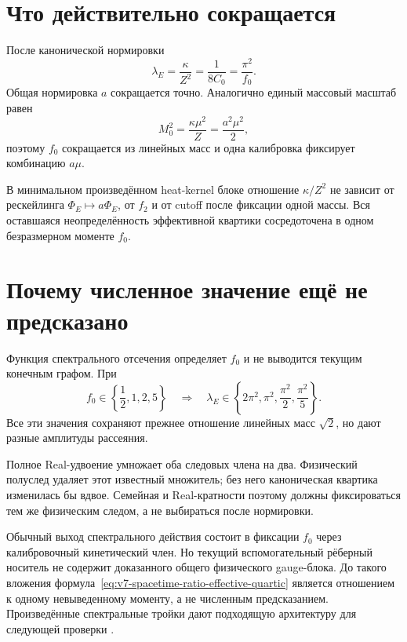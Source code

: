 \section{Что действительно сокращается}

После канонической нормировки
\begin{equation}
 \boxed{
 \lambda_E=\frac{\kappa}{Z^2}
 =\frac1{8C_0}=\frac{\pi^2}{f_0}.}
 \label{eq:v7-spacetime-ratio-effective-quartic}
\end{equation}
Общая нормировка $a$ сокращается точно. Аналогично единый массовый масштаб
равен
\begin{equation}
 M_0^2=\frac{\kappa\mu^2}{Z}
 =\frac{a^2\mu^2}{2},
 \label{eq:v7-spacetime-ratio-mass-scale}
\end{equation}
поэтому $f_0$ сокращается из линейных масс и одна калибровка фиксирует
комбинацию $a\mu$.

\begin{theorem}
В минимальном произведённом heat-kernel блоке отношение
$\kappa/Z^2$ не зависит от рескейлинга $\Phi_E\mapsto a\Phi_E$, от
$f_2$ и от cutoff после фиксации одной массы. Вся оставшаяся
неопределённость эффективной квартики сосредоточена в одном безразмерном
моменте $f_0$.
\end{theorem}

\section{Почему численное значение ещё не предсказано}

Функция спектрального отсечения определяет $f_0$ и не выводится текущим
конечным графом. При
\begin{equation}
 f_0\in\left\{\frac12,1,2,5\right\}
 \quad\Longrightarrow\quad
 \lambda_E\in\left\{2\pi^2,\pi^2,\frac{\pi^2}{2},\frac{\pi^2}{5}\right\}.
 \label{eq:v7-spacetime-ratio-f0-family}
\end{equation}
Все эти значения сохраняют прежнее отношение линейных масс $\sqrt2$, но
дают разные амплитуды рассеяния.

Полное Real-удвоение умножает оба следовых члена на два. Физический
полуслед удаляет этот известный множитель; без него каноническая квартика
изменилась бы вдвое. Семейная и Real-кратности поэтому должны фиксироваться
тем же физическим следом, а не выбираться после нормировки.

Обычный выход спектрального действия состоит в фиксации $f_0$ через
калибровочный кинетический член. Но текущий вспомогательный рёберный носитель
не содержит доказанного общего физического gauge-блока. До такого вложения
формула~\eqref{eq:v7-spacetime-ratio-effective-quartic} является отношением
к одному невыведенному моменту, а не численным предсказанием. Произведённые
спектральные тройки дают подходящую архитектуру для следующей проверки
\cite{v7-spacetime-ratio-product}.

